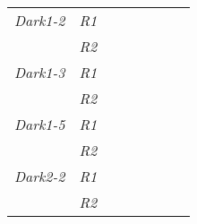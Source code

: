 \begin{table}[h]
\begin{tabular}{@{}|l|l|llllll@{}}
\textit{Dark1-2}     & \textit{R1}          &                                         &                                        &                                         & \multicolumn{1}{l|}{}                       & \multicolumn{1}{l|}{} &                                          \\ \cmidrule(lr){2-2}
                     & \textit{R2}          &                                         &                                        &                                         &                                             &                       &                                          \\ \cmidrule(r){1-2}
\textit{Dark1-3}     & \textit{R1}          &                                         &                                        &                                         & \multicolumn{1}{l|}{}                       & \multicolumn{1}{l|}{} &                                          \\ \cmidrule(lr){2-2}
                     & \textit{R2}          &                                         &                                        &                                         &                                             &                       &                                          \\ \cmidrule(r){1-2}
\textit{Dark1-5}     & \textit{R1}          &                                         &                                        &                                         & \multicolumn{1}{l|}{}                       & \multicolumn{1}{l|}{} &                                          \\ \cmidrule(lr){2-2}
                     & \textit{R2}          &                                         &                                        &                                         &                                             &                       &                                          \\ \cmidrule(r){1-2}
\textit{Dark2-2}     & \textit{R1}          &                                         &                                        &                                         & \multicolumn{1}{l|}{}                       & \multicolumn{1}{l|}{} &                                          \\ \cmidrule(lr){2-2}
                     & \textit{R2}          &                                         &                                        &                                         &                                             &                       &                                          \\ \cmidrule(r){1-2}

\end{tabular}
\end{table}

